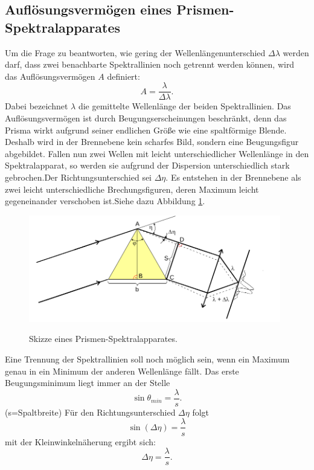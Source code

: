 \subsection{Auflösungsvermögen eines Prismen-Spektralapparates}
Um die Frage zu beantworten, wie gering der Wellenlängenunterschied $\Delta \lambda$
werden darf, dass zwei benachbarte Spektrallinien noch getrennt werden können,
wird das Auflösungsvermögen $A$ definiert:
\begin{equation}
  A=\frac{\lambda}{\Delta \lambda}.
  \label{eqn:auflösung}
\end{equation}
Dabei bezeichnet $\lambda$ die gemittelte Wellenlänge der beiden
Spektrallinien.
Das Auflösungsvermögen ist durch Beugungserscheinungen beschränkt, denn
das Prisma wirkt aufgrund seiner endlichen Größe wie eine
spaltförmige Blende. Deshalb wird in der Brennebene kein scharfes Bild, sondern
eine Beugungsfigur abgebildet.
Fallen nun zwei Wellen mit leicht unterschiedlicher Wellenlänge in den
Spektralapparat, so werden sie aufgrund der Dispersion unterschiedlich
stark gebrochen.Der Richtungsunterschied sei $\Delta \eta$.
Es entstehen in der Brennebene als zwei leicht unterschiedliche Brechungsfiguren,
deren Maximum leicht gegeneinander verschoben ist.Siehe dazu Abbildung
\ref{fig:auflösung}.

\begin{figure}[H]
  \centering
  \includegraphics[width=11cm]{beug.png}
  \caption{Skizze eines Prismen-Spektralapparates.}
  \label{fig:auflösung}
  \cite{skript}
\end{figure}

Eine Trennung der Spektrallinien soll noch möglich sein, wenn ein Maximum
genau in ein Minimum der anderen Wellenlänge fällt.
Das erste Beugungsminimum liegt immer an der Stelle
\begin{equation}
  \sin{\theta_{min}}=\frac{\lambda}{s}.
\end{equation}
(s=Spaltbreite)
Für den Richtungsunterschied $\Delta\eta$ folgt
\begin{equation}
  \sin({\Delta\eta})=\frac{\lambda}{s}
  \label{eqn:sineta}
\end{equation}
mit der Kleinwinkelnäherung ergibt sich:
\begin{equation}
  \Delta \eta =\frac{\lambda}{s}.
  \label{eqn:deltaeta}
\end{equation}

